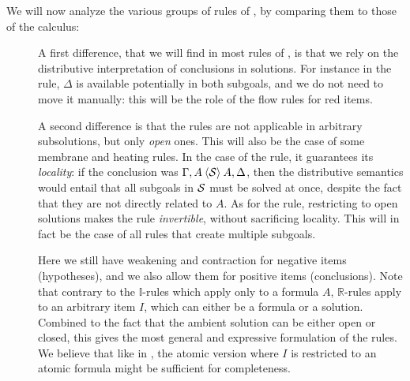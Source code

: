 We will now analyze the various groups of rules of , by
comparing them to those of the  calculus:
\begin{description}
  \item[\textbf{\identity}] 
  A first difference, that we will find in most rules of , is that
  we rely on the distributive interpretation of conclusions in solutions. For
  instance in the  rule, $\Delta$ is available potentially in
  both subgoals, and we do not need to move it manually: this will be the role
  of the flow rules for red items.
  
  A second difference is that the rules are not applicable in arbitrary
  subsolutions, but only \emph{open} ones. This will also be the case of some
  membrane and heating rules. In the case of the  rule, it
  guarantees its \emph{locality}: if the conclusion was $\Gamma, A \mathbin{\langle \mathcal{S} \rangle} A,
  \Delta$, then the distributive semantics would entail that all subgoals in
  $\mathcal{S}$ must be solved at once, despite the fact that they are not directly
  related to $A$. As for the
   rule, restricting to open solutions makes the rule
  \emph{invertible}, without sacrificing locality. This will in fact be the case
  of all rules that create multiple subgoals.

  \item[\textbf{\resource}] 
  Here we still have weakening and contraction for negative items (hypotheses),
  and we also allow them for positive items (conclusions). Note that contrary to
  the $\mathbb{I}$-rules which apply only to a formula $A$, $\mathbb{R}$-rules
  apply to an arbitrary item $I$, which can either be a formula or a solution.
  Combined to the fact that the ambient solution can be either open or closed,
  this gives the most general and expressive formulation of the rules. We
  believe that like in , the atomic version where $I$ is restricted to an
  atomic formula might be sufficient for completeness.

  \item[\textbf{\flow}]


\end{description}
